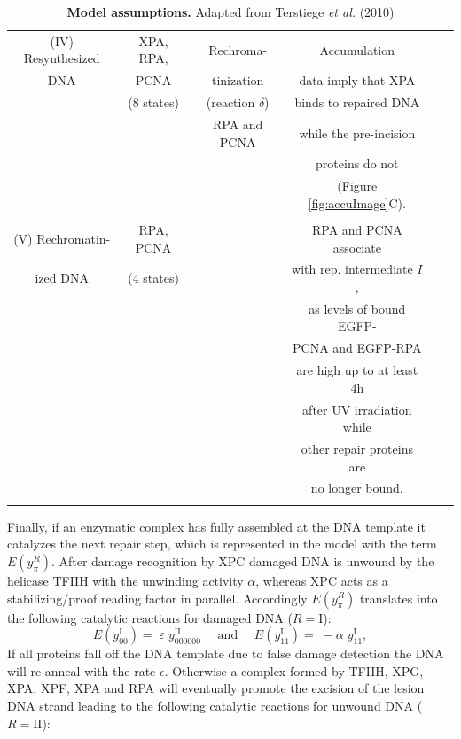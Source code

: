 \begin{table}[h]
{\begin{tabular}{cccccc}
			\rule{0pt}{3ex}
			(IV) Resynthesized&XPA, RPA,&Rechroma-&Accumulation&\cite{Moser2005}\\
			DNA&	 PCNA& tinization& data imply that XPA&  \cite{Shivji:1995:Biochemistry:7711023}\\
			&(8 states)&(reaction $\delta$)& binds  to repaired DNA &\cite{Luijsterburg2010}\\
			&&RPA and PCNA&while the pre-incision &\\
			&&&	  proteins do not &\\
			&&& (Figure \ref{fig:accuImage}C).&\\
			&&&& \\ \hline
			\rule{0pt}{3ex}
			(V) Rechromatin- &RPA, PCNA &&RPA and PCNA associate&\cite{Riedl2003}\\
			ized DNA &(4 states)	&&with rep. intermediate $I$,&\cite{Luijsterburg2010}\\
			&&&as levels of bound EGFP-&\\
			&&&PCNA and EGFP-RPA&\\ 
			&&& are  high up to at least 4h&\\
			&&& after UV irradiation while&\\
			&&& other repair proteins are&\\   
			&&& no longer bound.&\\   &&&& \\ \hline
		\end{tabular}}
		\caption{\textbf{Model assumptions.} Adapted from Terstiege \textit{et al.} (2010) \cite{Terstiege2010}}\label{tab:modelassumptions}
	\end{table}\clearpage
	


Finally, if an enzymatic complex has fully assembled at the DNA template it catalyzes the next repair step, which is represented in the model with the term $E(y_{\pi}^{R})$. After damage recognition by XPC damaged DNA is unwound by the helicase TFIIH with the unwinding activity $\alpha$, whereas XPC acts as a stabilizing/proof reading factor in parallel.  
Accordingly $E(y_{\pi}^{R})$ translates into the following catalytic reactions for damaged DNA ($R= \text{I}$):
$$E(y_{00}^\text{I})=\;\varepsilon\;y_{000000}^\text{II} \quad \text{ and }\quad
E(y_{11}^\text{I})=\;-\alpha \;y_{11}^\text{I},$$
If all proteins fall off the DNA template due to false damage detection the DNA will re-anneal with the rate $\epsilon$. Otherwise a complex formed by TFIIH, XPG, XPA, XPF, XPA and RPA will eventually promote the excision of the lesion DNA strand leading to the following catalytic reactions for unwound DNA ($R= \text{II}$): 

